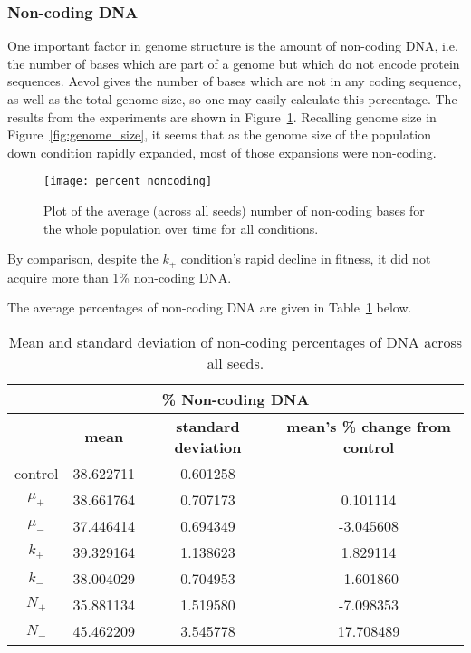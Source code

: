 \subsubsection{Non-coding DNA}
One important factor in genome structure is the amount of non-coding DNA, i.e. the number of bases which are part of a genome but which do not encode protein sequences. Aevol gives the number of bases which are not in any coding sequence, as well as the total genome size, so one may easily calculate this percentage. The results from the experiments are shown in Figure~\ref{fig:mean_non-coding_DNA}. Recalling genome size in Figure~\ref{fig:genome_size}, it seems that as the genome size of the population down condition rapidly expanded, most of those expansions were non-coding.
\begin{figure}[H]
	\centering
	\texttt{[image: percent\_noncoding]}
	\caption[Non-coding DNA]{Plot of the average (across all seeds) number of non-coding bases for the whole population over time for all conditions.}
	\label{fig:mean_non-coding_DNA}
\end{figure}
By comparison, despite the $k_+$ condition's rapid decline in fitness, it did not acquire more than 1\% non-coding DNA. 

The average percentages of non-coding DNA are given in Table~\ref{table:non-coding_DNA_mean_and_standard_deviation} below. 
\begin{table}[H]
	\begin{tabular}{|c|c|c|c|}
		\hline
		\multicolumn{4}{c}{\Large \textbf{\% Non-coding DNA}} \\
		\hline
		& \textbf{mean} & \textbf{standard deviation} & \textbf{mean's \% change from control} \\
		\hline \hline
		control & 38.622711 & 0.601258 & \textemdash \\ 
		\hline
		$\mu_+$ & 38.661764 & 0.707173 & 0.101114 \\ 
		\hline
		$\mu_-$ & 37.446414 & 0.694349 & -3.045608 \\ 
		\hline
		$k_+$ & 39.329164 & 1.138623 & 1.829114 \\ 
		\hline
		$k_-$ & 38.004029 & 0.704953 & -1.601860 \\ 
		\hline
		$N_+$ & 35.881134 & 1.519580 & -7.098353 \\ 
		\hline
		$N_-$ & 45.462209 & 3.545778 & 17.708489 \\ 
		\hline
	\end{tabular}
	\caption[Non-coding DNA mean and standard deviation]{Mean and standard deviation of non-coding percentages of DNA across all seeds.}
	\label{table:non-coding_DNA_mean_and_standard_deviation}
\end{table}

